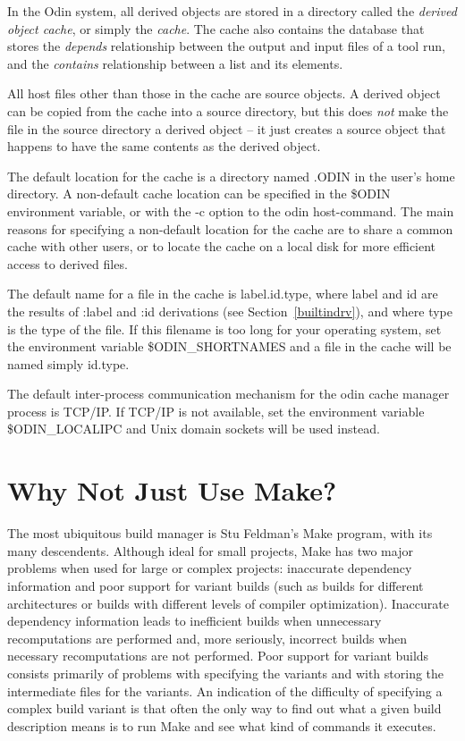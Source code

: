 In the Odin system, all derived objects are stored in a directory
called the {\em derived object cache}, or simply the {\em cache}.
The cache also contains the database that stores the
{\em depends} relationship between the output and input files of a tool run,
and the {\em contains} relationship between a list and its elements.

All host files other than those in the cache are source objects.
A derived object can be copied from the cache into a source directory,
but this does {\em not} make the file in the source directory a derived
object -- it just creates a source object that happens to have the
same contents as the derived object.

The default location for the cache is a directory named {\ex .ODIN}
in the user's home directory.
A non-default cache location can be specified
in the {\ex \$ODIN} environment variable,
or with the {\ex -c} option to the {\ex odin} host-command.
The main reasons for specifying a non-default location for
the cache are to share a common cache with other users,
or to locate the cache on a local disk for more efficient access
to derived files.

The default name for a file in the cache is {\ex label.id.type},
where {\ex label} and {\ex id} are the results of {\ex :label}
and {\ex :id} derivations (see Section~\ref{builtindrv}),
and where {\ex type} is the type of the file.
If this filename is too long for your operating system,
set the environment variable {\$ODIN\_SHORTNAMES} and a file
in the cache will be named simply {\ex id.type}.

The default inter-process communication mechanism 
for the odin cache manager process is TCP/IP.  
If TCP/IP is not available,
set the environment variable {\$ODIN\_LOCALIPC}
and Unix domain sockets will be used instead.


\section{Why Not Just Use Make?}

The most ubiquitous build manager is Stu Feldman's Make program\cite{Make},
with its many descendents\cite{Build}\cite{GNUMake}\cite{Mk}\cite{NMake}.
Although ideal for small projects, Make has two major problems when used
for large or complex projects: inaccurate dependency information and poor
support for variant builds (such as builds for different architectures
or builds with different levels of compiler optimization).
Inaccurate dependency information leads to
inefficient builds when unnecessary recomputations are performed and,
more seriously, incorrect builds when necessary recomputations are not
performed.
Poor support for variant builds consists primarily of problems
with specifying the variants
and with storing the intermediate files for the variants.
An indication of the difficulty of specifying a complex build variant
is that often the only way to find out what a given build
description means is to run Make and see what kind of commands it executes.

